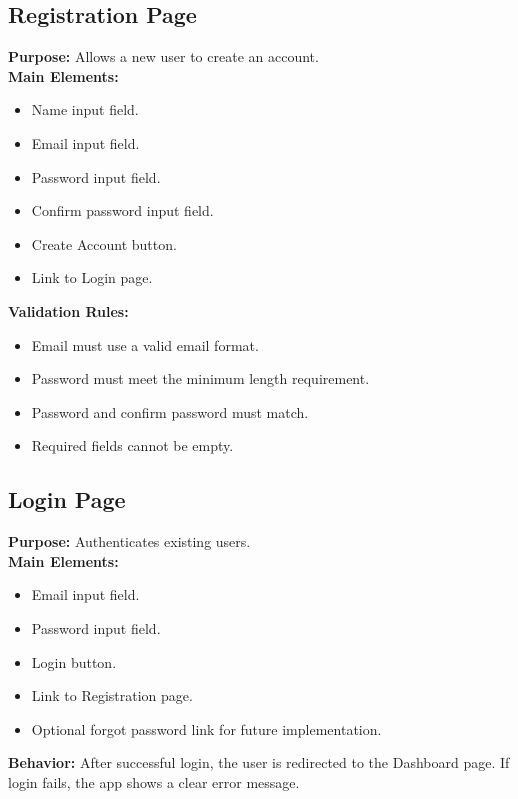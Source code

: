 \documentclass[12pt]{article}
\begin{document}
\subsection{Registration Page}
\textbf{Purpose:} Allows a new user to create an account.\\
\textbf{Main Elements:}
\begin{itemize}[leftmargin=*]
    \item Name input field.
    \item Email input field.
    \item Password input field.
    \item Confirm password input field.
    \item Create Account button.
    \item Link to Login page.
\end{itemize}
\textbf{Validation Rules:}
\begin{itemize}[leftmargin=*]
    \item Email must use a valid email format.
    \item Password must meet the minimum length requirement.
    \item Password and confirm password must match.
    \item Required fields cannot be empty.
\end{itemize}

\subsection{Login Page}
\textbf{Purpose:} Authenticates existing users.\\
\textbf{Main Elements:}
\begin{itemize}[leftmargin=*]
    \item Email input field.
    \item Password input field.
    \item Login button.
    \item Link to Registration page.
    \item Optional forgot password link for future implementation.
\end{itemize}
\textbf{Behavior:} After successful login, the user is redirected to the Dashboard page. If login fails, the app shows a clear error message.
\end{document}
